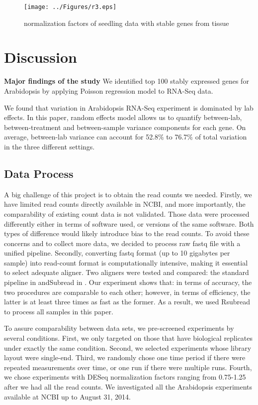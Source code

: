 \documentclass[11pt, a4paper]{article}
\begin{document}
 \begin{figure}[h!]
\begin{center}
\texttt{[image: ../Figures/r3.eps]}
\caption{\label{fig:scaled_diss} normalization factors of seedling data with stable genes from tissue }
\end{center}
\end{figure}

  \section{Discussion}
  \textbf{Major findings of the study}
   We identified top 100 stably expressed genes for Arabidopsis by applying Poisson regression model to RNA-Seq data.
   
   We found that variation in Arabidopsis RNA-Seq experiment is dominated by lab effects. In this paper, random effects model allows us to quantify  between-lab, between-treatment and between-sample variance components for each gene.
On average, between-lab variance can account for 52.8\% to 76.7\% of total variation in the three different settings.
  \subsection{Data Process}
  A big challenge of this project is to obtain the read counts we needed. Firstly, we have limited read counts directly available in NCBI, and more importantly,  the comparability of existing count data is not validated. Those data were processed differently either in terms of software used, or versions of the same software. Both types of difference would likely introduce bias to the read counts. To avoid these concerns and to collect more data, we decided to process raw fastq file with a unified pipeline. Secondly, converting fastq format (up to 10 gigabytes per sample)  into read-count format is computationally intensive, making it essential to select adequate aligner. Two aligners were tested and compared: the standard pipeline in \cite{anders2013count} andSubread in \cite{liao2013subread}.  Our experiment shows that:  in terms of accuracy, the two procedures are comparable to each other; however, in terms of efficiency, the latter is at least three times as fast as the former. As a result, we used Rsubread to process all samples in this paper.

To assure comparability between data sets, we pre-screened experiments by several conditions. First, we only targeted on those that have biological replicates under exactly the same condition. Second, we selected experiments whose library layout were single-end. Third, we randomly chose one time period if there were repeated measurements over time, or one run if there were multiple runs. Fourth, we chose experiments with DESeq normalization factors ranging from 0.75-1.25 after we had all the read counts. We investigated all the Arabidopsis experiments available at NCBI up to August 31, 2014.
\end{document}
